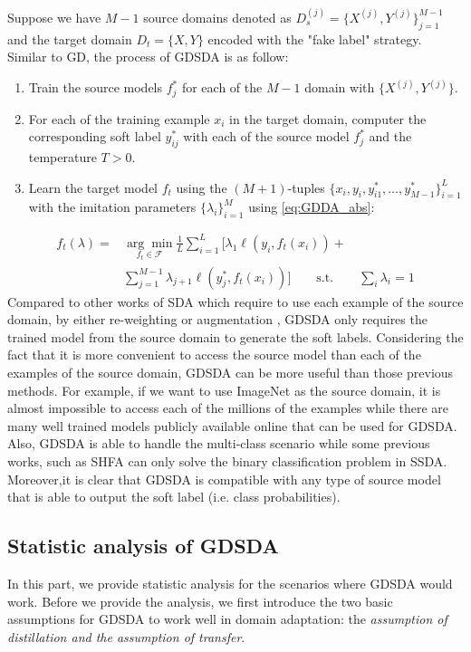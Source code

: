 Suppose we have $M-1$ source domains denoted as $D_s^{(j)}=\{X^{(j)},Y^{(j)}\}_{j=1}^{M-1}$ and the target domain $D_t=\{X,Y\}$ encoded with the "fake label" strategy. Similar to GD, the process of GDSDA is as follow:
\begin{enumerate}
    \item Train the source models $f^*_j$ for each of the $M-1$ domain with $\{X^{(j)},Y^{(j)}\}$.
    \item For each of the training example $x_i$ in the target domain, computer the corresponding soft label $y^*_{ij}$ with each of the source model $f^*_j$ and the temperature $T>0$.
    \item Learn the target model $f_t$ using the $(M+1)$-tuples $\{x_i,y_i,y^*_{i1},\dots,y^*_{M-1}\}_{i=1}^L$ with the imitation parameters $\{\lambda_i\}^M_{i=1}$ using \eqref{eq:GDDA_abs}:
\end{enumerate} 
\begin{equation}\label{eq:GDDA_abs}
\begin{aligned}
f_t(\lambda)=&\underset{f_t \in \mathcal{F}}{\arg \min}\frac{1}{L}\sum_{i=1}^{L}\bigg[\lambda_1\ell\left(y_i,f_t(x_i)\right)+\\&\sum_{j=1}^{M-1}\lambda_{j+1}\ell\left(y^*_j,f_t(x_i)\right)\bigg]\qquad
 \text{s.t.} \qquad \sum_i\lambda_i=1
\end{aligned}
\end{equation}
Compared to other works of SDA which require to use each example of the source domain, by either re-weighting \cite{Donahue_2013_CVPR,duan2012visual} or augmentation \cite{daume2010frustratingly}, GDSDA only requires the trained model from the source domain to generate the soft labels. Considering the fact that it is more convenient to access the source model than each of the examples of the source domain, GDSDA can be more useful than those previous methods. For example, if we want to use ImageNet \cite{imagenet_cvpr09} as the source domain, it is almost impossible to access each of the millions of the examples while there are many well trained models publicly available online that can be used for GDSDA. Also, GDSDA is able to handle the multi-class scenario while some previous works, such as SHFA\cite{duan2012learning} can only solve the binary classification problem in SSDA. Moreover,it is clear that GDSDA is compatible with any type of source model that is able to output the soft label (i.e. class probabilities).

\subsection{Statistic analysis of GDSDA}
In this part, we provide statistic analysis for the scenarios where GDSDA would work. Before we provide the analysis, we first introduce the two basic assumptions for GDSDA to work well in domain adaptation: the \textit{assumption of distillation and the assumption of  transfer}.


